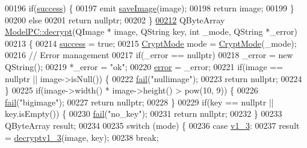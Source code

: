 \begin{DoxyCode}
00196     \textcolor{keywordflow}{if}(\hyperlink{class_model_p_c_a945ffbbc44a832b953c191debd448f4c}{success}) \{
00197         emit \hyperlink{class_model_p_c_a41f5e2e8022679046e4d3fa1109025fa}{saveImage}(image);
00198         \textcolor{keywordflow}{return} image;
00199     \}
00200     \textcolor{keywordflow}{else}
00201         \textcolor{keywordflow}{return} \textcolor{keyword}{nullptr};
00202 \}
\hypertarget{modelpc_8cpp_source.tex_l00212}{}\hyperlink{class_model_p_c_a5995215a34a1e1f504035715a8013809}{00212} QByteArray \hyperlink{class_model_p_c_a5995215a34a1e1f504035715a8013809}{ModelPC::decrypt}(QImage * image, QString key, \textcolor{keywordtype}{int} \_mode, QString *\_error)
00213 \{
00214     \hyperlink{class_model_p_c_a945ffbbc44a832b953c191debd448f4c}{success} = \textcolor{keyword}{true};
00215     \hyperlink{class_model_p_c_a296dd7afe3e1c49b3da25fd644fe4ceb}{CryptMode} mode = \hyperlink{class_model_p_c_a296dd7afe3e1c49b3da25fd644fe4ceb}{CryptMode}(\_mode);
00216     \textcolor{comment}{// Error management}
00217     \textcolor{keywordflow}{if}(\_error == \textcolor{keyword}{nullptr})
00218         \_error = \textcolor{keyword}{new} QString();
00219     *\_error = \textcolor{stringliteral}{"ok"};
00220     \hyperlink{class_model_p_c_a4e5a9c0ca1f06fe5bc478b6bf248c37c}{error} = \_error;
00221     \textcolor{keywordflow}{if}(image == \textcolor{keyword}{nullptr} || image->isNull()) \{
00222         \hyperlink{class_model_p_c_a47464b59b7e37fcee25e55475708aabd}{fail}(\textcolor{stringliteral}{"nullimage"});
00223         \textcolor{keywordflow}{return} \textcolor{keyword}{nullptr};
00224     \}
00225     \textcolor{keywordflow}{if}(image->width() * image->height() > pow(10, 9)) \{
00226         \hyperlink{class_model_p_c_a47464b59b7e37fcee25e55475708aabd}{fail}(\textcolor{stringliteral}{"bigimage"});
00227         \textcolor{keywordflow}{return} \textcolor{keyword}{nullptr};
00228     \}
00229     \textcolor{keywordflow}{if}(key == \textcolor{keyword}{nullptr} || key.isEmpty()) \{
00230         \hyperlink{class_model_p_c_a47464b59b7e37fcee25e55475708aabd}{fail}(\textcolor{stringliteral}{"no\_key"});
00231         \textcolor{keywordflow}{return} \textcolor{keyword}{nullptr};
00232     \}
00233     QByteArray result;
00234 
00235     \textcolor{keywordflow}{switch} (mode) \{
00236     \textcolor{keywordflow}{case} \hyperlink{class_model_p_c_a296dd7afe3e1c49b3da25fd644fe4ceba7612e38de7178170655a56ddcf96e12c}{v1\_3}:
00237         result = \hyperlink{class_model_p_c_a4fe70ebbedfaf31d45a35f82d0f06caa}{decryptv1\_3}(image, key);
00238     \textcolor{keywordflow}{break};

\end{DoxyCode}
